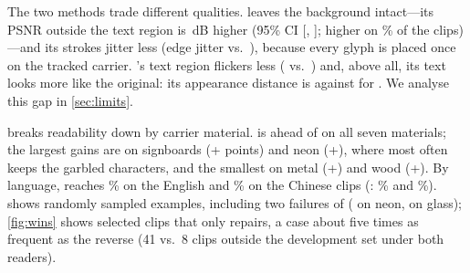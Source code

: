 The two methods trade different qualities. \method leaves the background intact---its PSNR outside the text region is \rBGDiff\,dB higher (95\% CI [\rBGDiffLo, \rBGDiffHi]; higher on \rBGHigherPct\% of the clips)---and its strokes jitter less (edge jitter \rOursJitter{} vs.\ \rSteerJitter), because every glyph is placed once on the tracked carrier. \steer's text region flickers less (\rSteerFlicker{} vs.\ \rOursFlicker) and, above all, its text looks more like the original: its appearance distance is \rSteerMad{} against \rOursMad{} for \method. We analyse this gap in \cref{sec:limits}.

 breaks readability down by carrier material. \method is ahead of \steer on all seven materials; the largest gains are on signboards (+\rGainSignboard{} points) and neon (+\rGainNeon), where \steer most often keeps the garbled characters, and the smallest on metal (+\rGainMetal) and wood (+\rGainWood). By language, \method reaches \rOursEn\% on the \rEnN{} English and \rOursZh\% on the \rZhN{} Chinese clips (\steer: \rSteerEn\% and \rSteerZh\%).  shows randomly sampled examples, including two failures of \method ( on neon,  on glass); \cref{fig:wins} shows selected clips that only \method repairs, a case about five times as frequent as the reverse (41 vs.\ 8 clips outside the development set under both readers).


